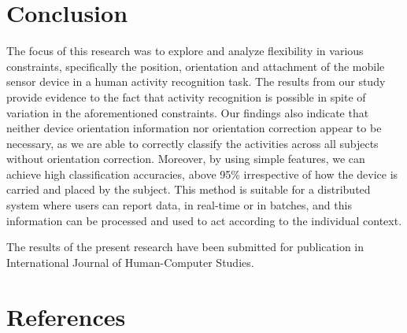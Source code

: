 \documentclass[5p]{elsarticle}
\begin{document}
\newpage
\section{Conclusion}
The focus of this research was to explore and analyze flexibility in various constraints, specifically the position, orientation and attachment of the mobile sensor device in a human activity recognition task. The results from our study provide evidence to the fact that activity recognition is possible in spite of variation in the aforementioned constraints. Our findings also indicate that neither device orientation information nor orientation correction appear to be necessary, as we are able to correctly classify the activities across all subjects without orientation correction. Moreover, by using simple features, we can achieve high classification accuracies, above 95\% irrespective of how the device is carried and placed by the subject. This method is suitable for a distributed system where users can report data, in real-time or in batches, and this information can be processed and used to act according to the individual context.

The results of the present research have been submitted for publication in International Journal of Human-Computer Studies.


\section*{References}


\end{document}
